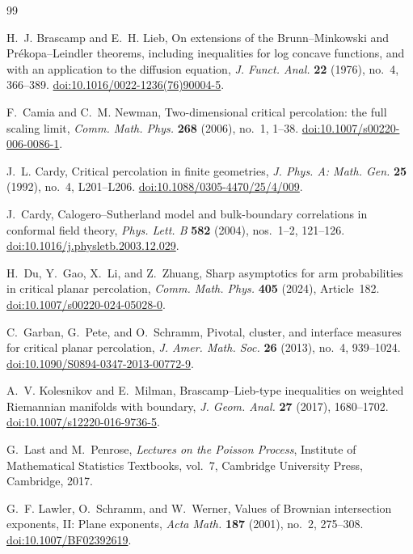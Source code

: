 \begin{thebibliography}{99}

H.~J. Brascamp and E.~H. Lieb,
On extensions of the Brunn--Minkowski and Pr\'ekopa--Leindler theorems,
including inequalities for log concave functions, and with an application
to the diffusion equation,
\emph{J. Funct. Anal.} \textbf{22} (1976), no.~4, 366--389.
\href{https://doi.org/10.1016/0022-1236(76)90004-5}{doi:10.1016/0022-1236(76)90004-5}.

F.~Camia and C.~M. Newman,
Two-dimensional critical percolation: the full scaling limit,
\emph{Comm. Math. Phys.} \textbf{268} (2006), no.~1, 1--38.
\href{https://doi.org/10.1007/s00220-006-0086-1}{doi:10.1007/s00220-006-0086-1}.

J.~L. Cardy,
Critical percolation in finite geometries,
\emph{J. Phys. A: Math. Gen.} \textbf{25} (1992), no.~4, L201--L206.
\href{https://doi.org/10.1088/0305-4470/25/4/009}{doi:10.1088/0305-4470/25/4/009}.

J.~Cardy,
Calogero--Sutherland model and bulk-boundary correlations in conformal
field theory,
\emph{Phys. Lett. B} \textbf{582} (2004), nos.~1--2, 121--126.
\href{https://doi.org/10.1016/j.physletb.2003.12.029}{doi:10.1016/j.physletb.2003.12.029}.

H.~Du, Y.~Gao, X.~Li, and Z.~Zhuang,
Sharp asymptotics for arm probabilities in critical planar percolation,
\emph{Comm. Math. Phys.} \textbf{405} (2024), Article~182.
\href{https://doi.org/10.1007/s00220-024-05028-0}{doi:10.1007/s00220-024-05028-0}.

C.~Garban, G.~Pete, and O.~Schramm,
Pivotal, cluster, and interface measures for critical planar percolation,
\emph{J. Amer. Math. Soc.} \textbf{26} (2013), no.~4, 939--1024.
\href{https://doi.org/10.1090/S0894-0347-2013-00772-9}{doi:10.1090/S0894-0347-2013-00772-9}.

A.~V. Kolesnikov and E.~Milman,
Brascamp--Lieb-type inequalities on weighted Riemannian manifolds
with boundary,
\emph{J. Geom. Anal.} \textbf{27} (2017), 1680--1702.
\href{https://doi.org/10.1007/s12220-016-9736-5}{doi:10.1007/s12220-016-9736-5}.

G.~Last and M.~Penrose,
\emph{Lectures on the Poisson Process},
Institute of Mathematical Statistics Textbooks, vol.~7,
Cambridge University Press, Cambridge, 2017.

G.~F. Lawler, O.~Schramm, and W.~Werner,
Values of Brownian intersection exponents, II: Plane exponents,
\emph{Acta Math.} \textbf{187} (2001), no.~2, 275--308.
\href{https://doi.org/10.1007/BF02392619}{doi:10.1007/BF02392619}.


\end{thebibliography}
